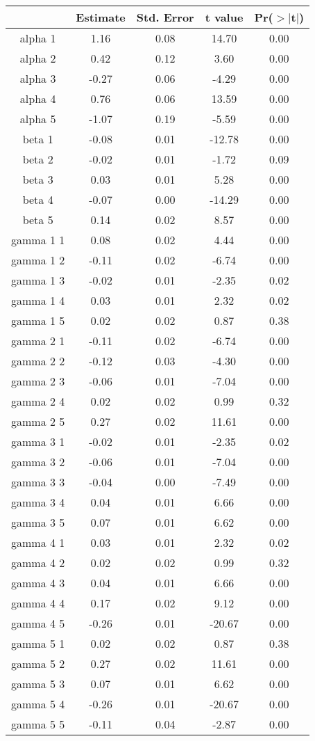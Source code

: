 \begin{tabular}{ccccc}
  \hline
 & Estimate & Std. Error & t value & Pr($>$$|$t$|$) \\ 
  \hline
alpha 1 & 1.16 & 0.08 & 14.70 & 0.00 \\ 
  alpha 2 & 0.42 & 0.12 & 3.60 & 0.00 \\ 
  alpha 3 & -0.27 & 0.06 & -4.29 & 0.00 \\ 
  alpha 4 & 0.76 & 0.06 & 13.59 & 0.00 \\ 
  alpha 5 & -1.07 & 0.19 & -5.59 & 0.00 \\ 
  beta 1 & -0.08 & 0.01 & -12.78 & 0.00 \\ 
  beta 2 & -0.02 & 0.01 & -1.72 & 0.09 \\ 
  beta 3 & 0.03 & 0.01 & 5.28 & 0.00 \\ 
  beta 4 & -0.07 & 0.00 & -14.29 & 0.00 \\ 
  beta 5 & 0.14 & 0.02 & 8.57 & 0.00 \\ 
  gamma 1 1 & 0.08 & 0.02 & 4.44 & 0.00 \\ 
  gamma 1 2 & -0.11 & 0.02 & -6.74 & 0.00 \\ 
  gamma 1 3 & -0.02 & 0.01 & -2.35 & 0.02 \\ 
  gamma 1 4 & 0.03 & 0.01 & 2.32 & 0.02 \\ 
  gamma 1 5 & 0.02 & 0.02 & 0.87 & 0.38 \\ 
  gamma 2 1 & -0.11 & 0.02 & -6.74 & 0.00 \\ 
  gamma 2 2 & -0.12 & 0.03 & -4.30 & 0.00 \\ 
  gamma 2 3 & -0.06 & 0.01 & -7.04 & 0.00 \\ 
  gamma 2 4 & 0.02 & 0.02 & 0.99 & 0.32 \\ 
  gamma 2 5 & 0.27 & 0.02 & 11.61 & 0.00 \\ 
  gamma 3 1 & -0.02 & 0.01 & -2.35 & 0.02 \\ 
  gamma 3 2 & -0.06 & 0.01 & -7.04 & 0.00 \\ 
  gamma 3 3 & -0.04 & 0.00 & -7.49 & 0.00 \\ 
  gamma 3 4 & 0.04 & 0.01 & 6.66 & 0.00 \\ 
  gamma 3 5 & 0.07 & 0.01 & 6.62 & 0.00 \\ 
  gamma 4 1 & 0.03 & 0.01 & 2.32 & 0.02 \\ 
  gamma 4 2 & 0.02 & 0.02 & 0.99 & 0.32 \\ 
  gamma 4 3 & 0.04 & 0.01 & 6.66 & 0.00 \\ 
  gamma 4 4 & 0.17 & 0.02 & 9.12 & 0.00 \\ 
  gamma 4 5 & -0.26 & 0.01 & -20.67 & 0.00 \\ 
  gamma 5 1 & 0.02 & 0.02 & 0.87 & 0.38 \\ 
  gamma 5 2 & 0.27 & 0.02 & 11.61 & 0.00 \\ 
  gamma 5 3 & 0.07 & 0.01 & 6.62 & 0.00 \\ 
  gamma 5 4 & -0.26 & 0.01 & -20.67 & 0.00 \\ 
  gamma 5 5 & -0.11 & 0.04 & -2.87 & 0.00 \\ 
   \hline
\end{tabular}
